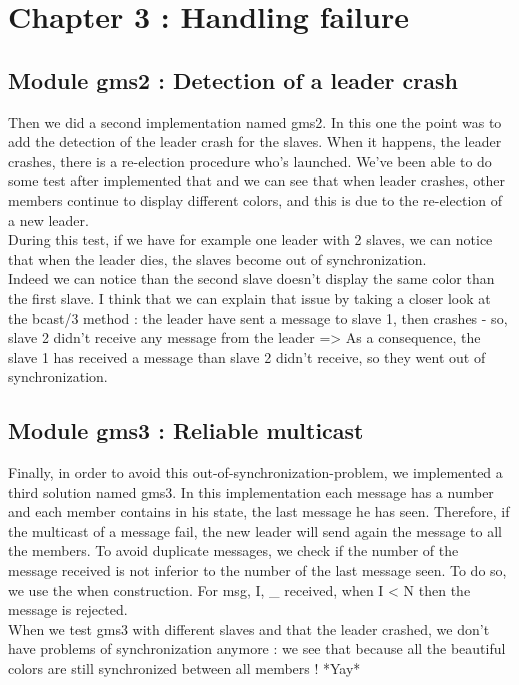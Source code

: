 \documentclass[a4paper, 11pt]{article}
\begin{document}
\section{Chapter 3 : Handling failure}

\subsection{Module gms2 : Detection of a leader crash}

Then we did a second implementation named gms2. In this one the point was to add the detection of the leader crash for the slaves. When it happens, the leader crashes, there is a re-election procedure who's launched. We've been able to do some test after implemented that and we can see that when leader crashes, other members continue to display different colors, and this is due to the re-election of a new leader.\\

During this test, if we have for example one leader with 2 slaves, we can notice that when the leader dies, the slaves become out of synchronization.\\
Indeed we can notice than the second slave doesn't display the same color than the first slave. I think that we can explain that issue by taking a closer look at the bcast/3 method : the leader have sent a message to slave 1, then crashes - so, slave 2 didn't receive any message from the leader => As a consequence, the slave 1 has received a message than slave 2 didn't receive, so they went out of synchronization.

\subsection{Module gms3 : Reliable multicast}

Finally, in order to avoid this out-of-synchronization-problem, we implemented a third solution named gms3. In this implementation each message has a number and each member contains in his state, the last message he has seen. Therefore, if the multicast of a message fail, the new leader will send again the message to all the members. To avoid duplicate messages, we check if the number of the message received is not inferior to the number of the last message seen. To do so, we use the when construction. For {msg, I, _} received, when I < N then the message is rejected.\\

When we test gms3 with different slaves and that the leader crashed, we don't have problems of synchronization anymore : we see that because all the beautiful colors are still synchronized between all members ! *Yay*
\end{document}
